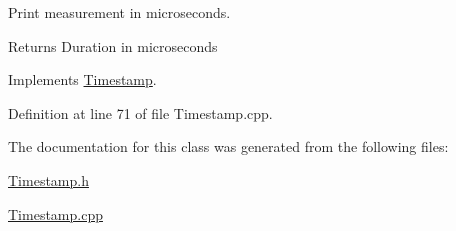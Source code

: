 Print measurement in microseconds. 

\begin{DoxyReturn}{Returns}
Duration in microseconds 
\end{DoxyReturn}


Implements \hyperlink{class_timestamp_a351537b95385937a004ab32b6b3743f7}{Timestamp}.



Definition at line 71 of file Timestamp.\+cpp.



The documentation for this class was generated from the following files\+:\begin{DoxyCompactItemize}
\item 
\hyperlink{_timestamp_8h}{Timestamp.\+h}\item 
\hyperlink{_timestamp_8cpp}{Timestamp.\+cpp}\end{DoxyCompactItemize}
